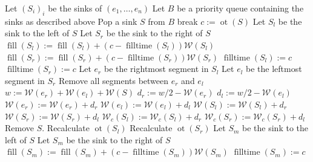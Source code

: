 \documentclass[11pt,a4paper]{article}
\DeclareMathOperator{\ot}{ot}
\DeclareMathOperator{\Fill}{fill}
\DeclareMathOperator{\filltime}{filltime}
\begin{document}
\begin{algorithmic}[1]
    \State Let $(S_i)_i$ be the sinks of $(e_1,\ldots,e_n)$
    \State Let $B$ be a priority queue containing the sinks as described above
     \label{a2:while}
        \State Pop a sink $S$ from $B$  \label{a2:firstline}
        \If{$\ot(S)\ge T$} \label{a2:otget}
            \State break
        \EndIf
        \State $c := \ot(S)$ \label{a2:cupd}
         \label{a2:bleqbr}
            \State Let $S_l$ be the sink to the left of $S$ \label{a2:getsl}
            \State Let $S_r$ be the sink to the right of $S$ \label{a2:getsr}
            \State $\Fill(S_l) := \Fill(S_l) + (c - \filltime(S_l))\mathcal{W}(S_l)$
            \State $\Fill(S_r) := \Fill(S_r) + (c - \filltime(S_r))\mathcal{W}(S_r)$
            \State $\filltime(S_l) := c$ \label{a2:setflsl}
            \State $\filltime(S_r) := c$
            \State Let $e_r$ be the rightmost segment in $S_l$ \label{a2:geter}
            \State Let $e_l$ be the leftmost segment in $S_r$ \label{a2:getel}
            \State Remove all segments between $e_r$ and $e_l$ \label{a2:remerel}
            \State $w := \mathcal{W}(e_r) + \mathcal{W}(e_l) +\mathcal{W}(S)$ \label{a2:defw}
            \State $d_r := w/2 - \mathcal{W}(e_r)$ \label{a2:defdr}
            \State $d_l := w/2 - \mathcal{W}(e_l)$ \label{a2:defdl}
            \State $\mathcal{W}(e_r) := \mathcal{W}(e_r) + d_r$ \label{a2:adlener}
            \State $\mathcal{W}(e_l) := \mathcal{W}(e_l) + d_l$ \label{a2:adlenel}
            \State $\mathcal{W}(S_l) := \mathcal{W}(S_l) + d_r$ \label{a2:adlenls}
            \State $\mathcal{W}(S_r) := \mathcal{W}(S_r) + d_l$ \label{a2:adlenrs}
              \State $\mathcal{W}_c(S_l) := \mathcal{W}_c(S_l) + d_r$ \label{a2:modwcsl}
            \EndIf
              \State $\mathcal{W}_c(S_r) := \mathcal{W}_c(S_r) + d_l$
            \EndIf
            \State Remove $S$. \label{a2:rems}
            \State Recalculate $\ot(S_l)$ \label{a2:recalotsl}
            \State Recalculate $\ot(S_r)$ \label{a2:recalotsr}
        \Else
             \label{a2:bllessbr}
              \State Let $S_m$ be the sink to the left of $S$ \label{a2:getsm}
            \Else
              \State Let $S_m$ be the sink to the right of $S$
            \EndIf
            \State $\Fill(S_m) := \Fill(S_m) + (c - \filltime(S_m))\mathcal{W}(S_m)$
            \State $\filltime(S_m) := c$ \label{a2:setflsm}

\end{algorithmic}
\end{document}
